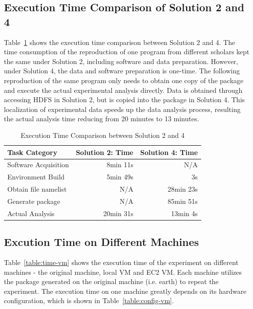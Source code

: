 \documentclass{acm_proc_article-sp}
\begin{document}
\subsection{Execution Time Comparison of Solution 2 and 4}

Table~\ref{table:time-2nd3rd} shows the execution time comparison between
Solution 2 and 4. The time consumption of the reproduction of one program from
different scholars kept the same under Solution 2, including software and data
preparation. However, under Solution 4, the data and software preparation is
one-time. The following reproduction of the same program only needs to obtain
one copy of the package and execute the actual experimental analysis directly.
Data is obtained through accessing HDFS in Solution 2, but is copied into the package in Solution 4. This localization of experimental data speeds up the data analysis process, resulting the actual analysis time reducing from 20 minutes to 13 minutes.

\begin{table}
    \centering
    \begin{tabular}{|l|r|r|}
    \hline
    Task Category & Solution 2: Time & Solution 4: Time\\ \hline
    Software Acquisition & 8min 11s & N/A \\ \hline
    Environment Build & 5min 49s  & 3s \\ \hline
    Obtain file namelist & N/A & 28min 23s \\ \hline
    Generate package & N/A & 85min 51s \\ \hline
    Actual Analysis & 20min 31s & 13min 4s \\ \hline
    \end{tabular}
    \caption{Execution Time Comparison between Solution 2 and 4}
    \label{table:time-2nd3rd}
\end{table}    

\subsection{Excution Time on Different Machines}
Table~\ref{table:time-vm} shows the execution time of the experiment on different machines - the original machine, local VM and EC2 VM. 
Each machine utilizes the package generated on the original machine (i.e. earth) to repeat the experiment.
The execution time on one machine greatly depends on its hardware configuration, which is shown in Table~\ref{table:config-vm}.
\end{document}
